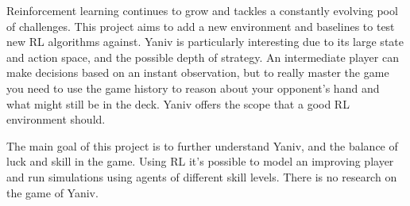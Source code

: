 \documentclass[../main.tex]{subfiles}
\begin{document}
Reinforcement learning continues to grow and tackles a constantly evolving pool of challenges. This project aims to add a new environment and baselines to test new RL algorithms against. Yaniv is particularly interesting due to its large state and action space, and the possible depth of strategy. An intermediate player can make decisions based on an instant observation, but to really master the game you need to use the game history to reason about your opponent's hand and what might still be in the deck. Yaniv offers the scope that a good RL environment should. 

The main goal of this project is to further understand Yaniv, and the balance of luck and skill in the game. Using RL it's possible to model an improving player and run simulations using agents of different skill levels. There is no research on the game of Yaniv. 
\end{document}
